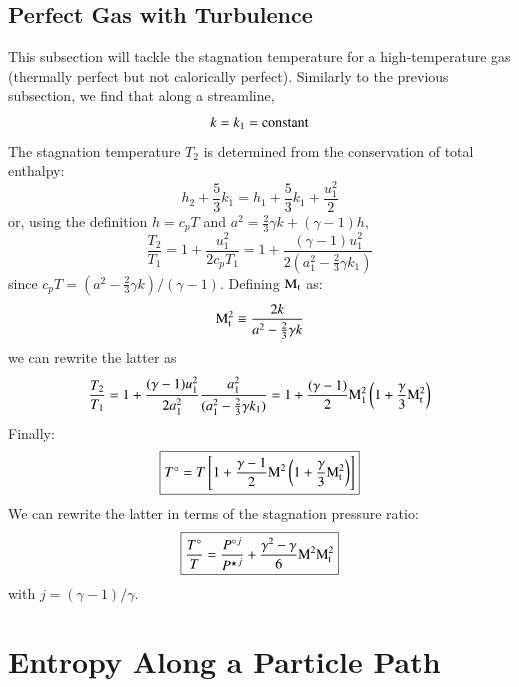 \documentclass{warpdoc}
\numberwithin{equation}{section}
\newcommand{\Cp}{{c_{p}}}
\newcommand{\turb}{_{\rm t}}
\newcommand{\mfd}{\displaystyle}
\newcommand\frameeqn[1]{\fbox{$#1$}}
\begin{document}
\subsection{Perfect Gas with Turbulence}

This subsection will tackle the stagnation temperature for a high-temperature
gas (thermally perfect but not calorically perfect).
Similarly to the previous subsection, we find that along a streamline,
%
\begin{equation}
  k=k_1={\rm constant}
\end{equation}
%
The stagnation temperature $T_2$ is determined from the conservation
of total enthalpy:
%
\begin{equation}
  h_2+\frac{5}{3}k_1=h_1+\frac{5}{3}k_1+\frac{u_1^2}{2}
\end{equation}
%
or, using the definition $h=\Cp T$ and $a^2=\frac{2}{3}\gamma k + (\gamma-1)h$,
%
\begin{equation}
  \frac{T_2}{T_1}= 1+\frac{u_1^2}{2\Cp T_1}
                 = 1+\frac{(\gamma-1) u_1^2}{2 (a_1^2-\frac{2}{3}\gamma k_1)}
\end{equation}
%
since $\Cp T=(a^2-\frac{2}{3}\gamma k)/(\gamma-1)$. Defining ${\rm M}\turb$ as:
%
\begin{equation}
  {\rm M}\turb^2 \equiv \frac{2 k}{a^2-\frac{2}{3}\gamma k}
\end{equation}
%
we can rewrite the latter as
%
\begin{equation}
  \frac{T_2}{T_1}
                 = 1+\frac{(\gamma-1) u_1^2}{2 a_1^2}
                     \frac{a_1^2}{(a_1^2-\frac{2}{3}\gamma k_1)}
                 = 1+\frac{(\gamma-1)}{2} {\rm M}_1^2
                     \left(1+\frac{\gamma}{3} {\rm M}\turb^2 \right)
\end{equation}
%
Finally:
%
\begin{equation}
 \frameeqn{
  T^\circ
                 = T \left[ 1+\mfd\frac{\gamma-1}{2} {\rm M}^2
                     \left(1+\mfd\frac{\gamma}{3} {\rm M}\turb^2 \right) \right]
 }
\end{equation}
%
We can rewrite the latter in terms of the stagnation pressure ratio:
%
\begin{equation}
 \frameeqn{
  \mfd\frac{T^\circ}{T}
                 = \mfd\frac{{P^\circ}^j}{{P^\star}^j}
                  +\mfd\frac{\gamma^2-\gamma}{6} {\rm M}^2 {\rm M}\turb^2
 }
\end{equation}
%
with $j=(\gamma-1)/\gamma$.




\section{Entropy Along a Particle Path}
\end{document}
